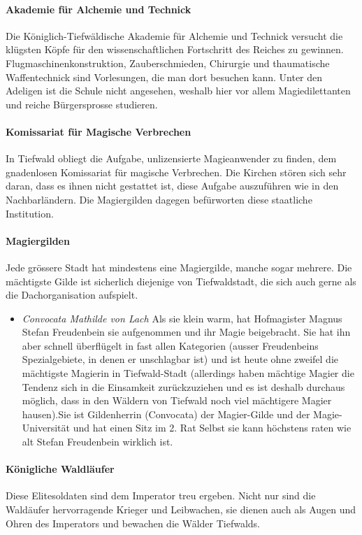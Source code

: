 \documentclass[10pt,twoside,twocolumn,openany]{book}
\begin{document}
\begin{multicols}{2}
	\paragraph{Akademie für Alchemie und Technick} Die Königlich-Tiefwäldische Akademie für Alchemie und Technick versucht die klügsten Köpfe für den wissenschaftlichen Fortschritt des Reiches zu gewinnen. Flugmaschinenkonstruktion, Zauberschmieden, Chirurgie und thaumatische Waffentechnick sind Vorlesungen, die man dort besuchen kann. Unter den Adeligen ist die Schule nicht angesehen, weshalb hier vor allem Magiedilettanten und reiche Bürgersprosse studieren.
	
	\paragraph{Komissariat für Magische Verbrechen} In Tiefwald obliegt die Aufgabe, unlizensierte Magieanwender zu finden, dem gnadenlosen Komissariat für magische Verbrechen. Die Kirchen stören sich sehr daran, dass es ihnen nicht gestattet ist, diese Aufgabe auszuführen wie in den Nachbarländern. Die Magiergilden dagegen befürworten diese staatliche Institution.
	
	\paragraph{Magiergilden} Jede grössere Stadt hat mindestens eine Magiergilde, manche sogar mehrere. Die mächtigste Gilde ist sicherlich diejenige von Tiefwaldstadt, die sich auch gerne als die Dachorganisation aufspielt.
	\begin{itemize}
		\item\textit{Convocata Mathilde von Lach} Als sie klein warm, hat Hofmagister Magnus Stefan Freudenbein sie aufgenommen und ihr Magie beigebracht. Sie hat ihn aber schnell überflügelt in fast allen Kategorien (ausser Freudenbeins Spezialgebiete, in denen er unschlagbar ist) und ist heute ohne zweifel die mächtigste Magierin in Tiefwald-Stadt (allerdings haben mächtige Magier die Tendenz sich in die Einsamkeit zurückzuziehen und es ist deshalb durchaus möglich, dass in den Wäldern von Tiefwald noch viel mächtigere Magier hausen).Sie ist Gildenherrin (Convocata) der Magier-Gilde und der Magie-Universität und hat einen Sitz im 2. Rat
		Selbst sie kann höchstens raten wie alt Stefan Freudenbein wirklich ist.
	\end{itemize}
	
	\paragraph{Königliche Waldläufer} Diese Elitesoldaten sind dem Imperator treu ergeben. Nicht nur sind die Waldäufer hervorragende Krieger und Leibwachen, sie dienen auch als Augen und Ohren des Imperators und bewachen die Wälder Tiefwalds.
	

\end{multicols}
\end{document}
